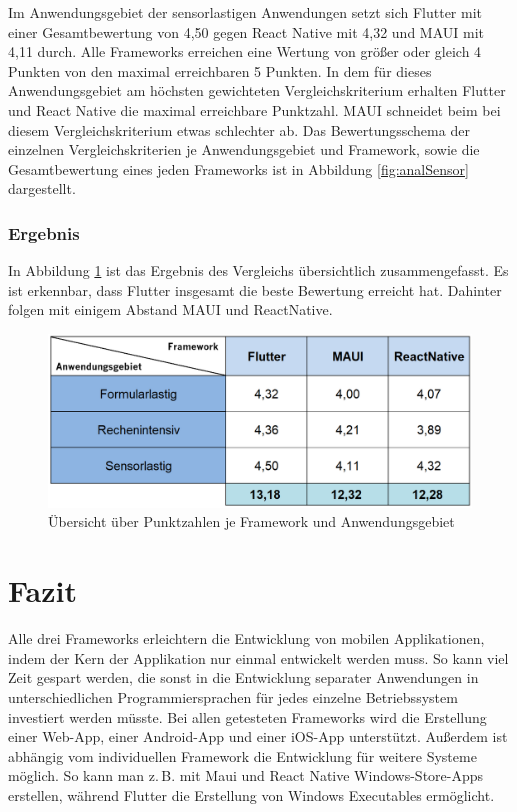 \documentclass[]{lni}
\begin{document}
Im Anwendungsgebiet der sensorlastigen Anwendungen setzt sich Flutter mit einer Gesamtbewertung von 4,50 gegen React Native mit 4,32 und MAUI mit 4,11 durch. Alle Frameworks erreichen eine Wertung von größer oder gleich 4 Punkten von den maximal erreichbaren 5 Punkten. In dem für dieses Anwendungsgebiet am höchsten gewichteten Vergleichskriterium erhalten Flutter und React Native die maximal erreichbare Punktzahl. MAUI schneidet beim bei diesem Vergleichskriterium etwas schlechter ab. Das Bewertungsschema der einzelnen Vergleichskriterien je Anwendungsgebiet und Framework, sowie die Gesamtbewertung eines jeden Frameworks ist in Abbildung \ref{fig:analSensor} dargestellt.

\subsubsection{Ergebnis}
In Abbildung \ref{fig:ergebnis} ist das Ergebnis des Vergleichs übersichtlich zusammengefasst. Es ist erkennbar, dass Flutter insgesamt die beste Bewertung erreicht hat. Dahinter folgen mit einigem Abstand MAUI und ReactNative.

\begin{figure}[ht]
	\centering
	\includegraphics[width=0.8\linewidth]{images/ergebnis.png}
	\caption{Übersicht über Punktzahlen je Framework und Anwendungsgebiet}
	\label{fig:ergebnis}
\end{figure}

\clearpage

\section{Fazit}
Alle drei Frameworks erleichtern die Entwicklung von mobilen Applikationen, indem der Kern der Applikation nur einmal entwickelt werden muss. So kann viel Zeit gespart werden, die sonst in die Entwicklung separater Anwendungen in unterschiedlichen Programmiersprachen für jedes einzelne Betriebssystem investiert werden müsste. Bei allen getesteten Frameworks wird die Erstellung einer Web-App, einer Android-App und einer iOS-App unterstützt. Außerdem ist abhängig vom individuellen Framework die Entwicklung für weitere Systeme möglich. So kann man z.\,B. mit Maui und React Native Windows-Store-Apps erstellen, während Flutter die Erstellung von Windows Executables ermöglicht.
\end{document}
